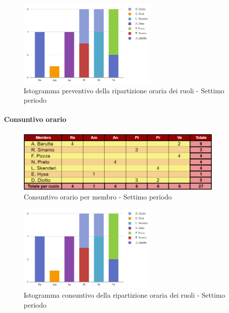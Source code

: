 \vspace{0.6cm}

\begin{figure}[H]
    \centering
    \includegraphics[width=0.6\textwidth]{../Images/preventivoDivisioneRuoli7Periodo.png}
    \caption{Istogramma preventivo della ripartizione oraria dei ruoli - Settimo periodo}
    \label{fig:Preventivo_ripartizione_oraria_7}
\end{figure}

\pagebreak

\paragraph{Consuntivo orario}

\begin{figure}[H]
    \centering
    \includegraphics[width=0.9\textwidth]{../Images/consuntivoOrario7Periodo.png}
    \caption{Consuntivo orario per membro - Settimo periodo}
    \label{fig:Constuntivo_orario_7}
\end{figure}

\vspace{0.6cm}

\begin{figure}[H]
    \centering
    \includegraphics[width=0.6\textwidth]{../Images/consuntivoDivisioneRuoli7Periodo.png}
    \caption{Istogramma consuntivo della ripartizione oraria dei ruoli - Settimo periodo}
    \label{fig:Consuntivo_ripartizione_oraria_7}
\end{figure}

